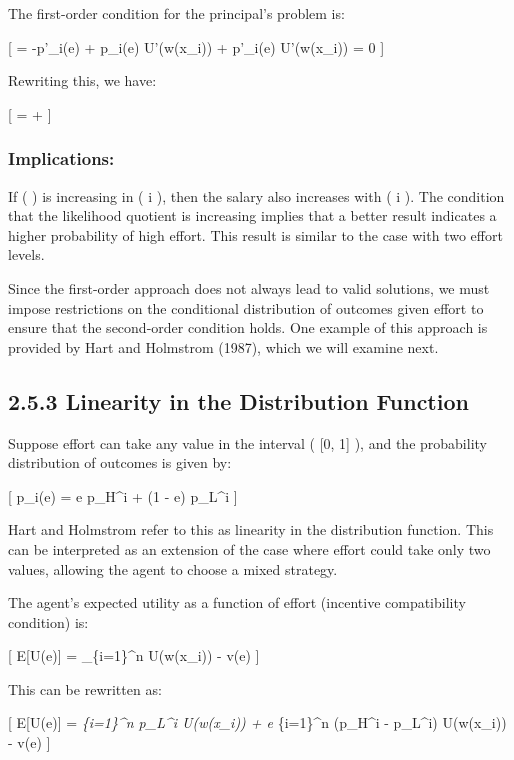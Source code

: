 \documentclass[
  letterpaper,
  DIV=11,
  numbers=noendperiod]{scrartcl}
\begin{document}
The first-order condition for the principal's problem is:

{[}  = -p'\_i(e) + \lambda p\_i(e)
U'(w(x\_i)) + \mu p'\_i(e) U'(w(x\_i)) = 0 {]}

Rewriting this, we have:

{[}  = \lambda + \mu {} {]}

\subsubsection{Implications:}\label{implications-1}

If (  ) is increasing in ( i ), then the salary
also increases with ( i ). The condition that the likelihood quotient is
increasing implies that a better result indicates a higher probability
of high effort. This result is similar to the case with two effort
levels.

Since the first-order approach does not always lead to valid solutions,
we must impose restrictions on the conditional distribution of outcomes
given effort to ensure that the second-order condition holds. One
example of this approach is provided by Hart and Holmstrom (1987), which
we will examine next.

\subsection{2.5.3 Linearity in the Distribution
Function}\label{linearity-in-the-distribution-function}

Suppose effort can take any value in the interval ( {[}0, 1{]} ), and
the probability distribution of outcomes is given by:

{[} p\_i(e) = e p\_H\^{}i + (1 - e) p\_L\^{}i {]}

Hart and Holmstrom refer to this as linearity in the distribution
function. This can be interpreted as an extension of the case where
effort could take only two values, allowing the agent to choose a mixed
strategy.

The agent's expected utility as a function of effort (incentive
compatibility condition) is:

{[} E{[}U(e){]} = \sum\_\{i=1\}\^{}n
\left[ e p_H^i + (1 - e) p_L^i \right] U(w(x\_i)) - v(e) {]}

This can be rewritten as:

{[} E{[}U(e){]} = \sum\emph{\{i=1\}\^{}n p\_L\^{}i U(w(x\_i)) + e
\sum}\{i=1\}\^{}n (p\_H\^{}i - p\_L\^{}i) U(w(x\_i)) - v(e) {]}
\end{document}
